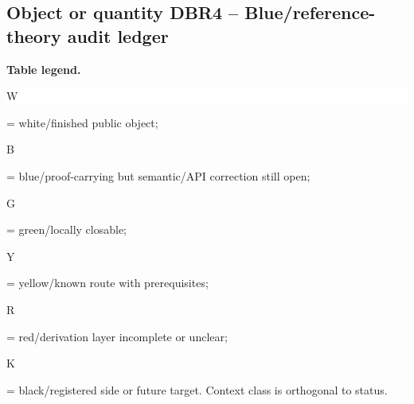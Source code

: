 \subsection*{Object or quantity DBR4 -- Blue/\allowbreak{}reference-theory audit ledger}
\hypertarget{objproof:DBR4}{}
\par\smallskip\noindent\begin{minipage}{0.99\linewidth}\footnotesize\raggedright\textbf{Table legend.} \colorbox{white}{\strut W} = white/finished public object; \colorbox{cyan!20}{\strut B} = blue/proof-carrying but semantic/API correction still open; \colorbox{green!18}{\strut G} = green/locally closable; \colorbox{yellow!25}{\strut Y} = yellow/known route with prerequisites; \colorbox{red!20}{\strut R} = red/derivation layer incomplete or unclear; \colorbox{black!18}{\strut K} = black/registered side or future target. Context class is orthogonal to status.\end{minipage}\par\vspace{0.25em}
